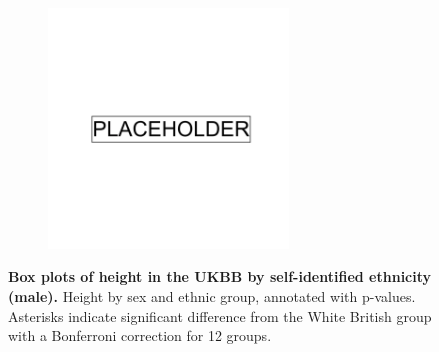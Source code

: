 \newpage

\begin{figure}[ht]
    \centering
    \begin{subfigure}{\textwidth}
    \includegraphics[width=0.7\textwidth]{placeholder.png}
    \end{subfigure}
    \caption[Box plots of height in the UKBB by self-identified ethnicity (male)]{\textbf{Box plots of height in the UKBB by self-identified ethnicity (male).} Height by sex and ethnic group, annotated with p-values. Asterisks indicate significant difference from the White British group with a Bonferroni correction for 12 groups.}
    \label{fig:supp_box_height_m}
\end{figure}

\newpage

